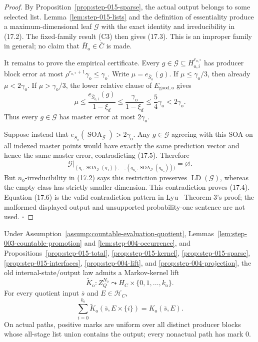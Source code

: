 \begin{proof}
By Proposition~\ref{prop:step-015-sparse}, the actual output belongs to
some selected list. Lemma~\ref{lem:step-015-lists} and the definition of
essentiality produce a maximum-dimensional leaf \(\mathcal G\) with the
exact identity and irreducibility in (17.2). The fixed-family
result (C3) then gives (17.3). This is an improper family in general; no
claim that \(\bar H_{\mathrm o}\in\bar C\) is made.

It remains to prove the empirical certificate. Every
\(g\in\mathcal G\subseteq H_{\mathrm o,i}^{r_{\mathrm o,*}}\) has producer
block error at most
\(\rho^{r_{\mathrm o,*}+1}\gamma_{\mathrm o}\le\gamma_{\mathrm o}\).
Write \(\mu=e_{\bar S_{\mathrm o}}(g)\). If
\(\mu\le\gamma_{\mathrm o}/3\), then already \(\mu<2\gamma_{\mathrm o}\).
If \(\mu>\gamma_{\mathrm o}/3\), the lower relative clause of
\(E_{\mathrm{good,o}}\) gives
\[
\mu\le\frac{e_{\bar S_{\mathrm o,i}}(g)}{1-\xi_d}
\le\frac{\gamma_{\mathrm o}}{1-\xi_d}
\le\frac54\gamma_{\mathrm o}<2\gamma_{\mathrm o}.
\tag{17.5}
\]
Thus every \(g\in\mathcal G\) has master error at most
\(2\gamma_{\mathrm o}\).

Suppose instead that
\(e_{\bar S_{\mathrm o}}(\operatorname{SOA}_{\mathcal G})
>2\gamma_{\mathrm o}\). Any \(g\in\mathcal G\) agreeing with this SOA on
all indexed master points would have exactly the same prediction vector
and hence the same master error, contradicting (17.5). Therefore
\[
\mathcal G|_{(q_1,\operatorname{SOA}_{\mathcal G}(q_1)),\ldots,
(q_{n_{\mathrm o}},
\operatorname{SOA}_{\mathcal G}(q_{n_{\mathrm o}})))}
=\varnothing.
\tag{17.6}
\]
But \(n_{\mathrm o}\)-irreducibility in (17.2) says this restriction
preserves \(\operatorname{LD}(\mathcal G)\), whereas the empty class has
strictly smaller dimension. This contradiction proves (17.4). Equation
(17.6) is the valid contradiction pattern in Lyu~\citep{lyu2025} Theorem 3's proof; the
malformed displayed output and unsupported probability-one sentence are
not used. \(\square\)


\end{proof}

\begin{proposition}\label{prop:step-015-mark}
Under Assumption~\ref{assump:countable-evaluation-quotient},
Lemmas~\ref{lem:step-003-countable-promotion} and
\ref{lem:step-004-occurrence}, and
Propositions~\ref{prop:step-015-total},
\ref{prop:step-015-kernel},
\ref{prop:step-015-sparse},
\ref{prop:step-015-interfaces},
\ref{prop:step-004-lift}, and
\ref{prop:step-004-projection}, the old internal-state/output law admits a
Markov-kernel lift
\[
\widetilde K_{\mathrm o}:
Z_Q^{N_{\mathrm o}}\leadsto
H_C\times\{0,1,\ldots,k_{\mathrm o}\}.
\tag{18.1}
\]
For every quotient input \(\bar s\) and \(E\in\mathcal H_C\),
\[
\sum_{i=0}^{k_{\mathrm o}}
\widetilde K_{\mathrm o}(\bar s,E\times\{i\})
=K_{\mathrm o}(\bar s,E).
\tag{18.2}
\]
On actual paths, positive marks are uniform over all distinct producer
blocks whose all-stage list union contains the output; every nonactual
path has mark \(0\).


\end{proposition}

